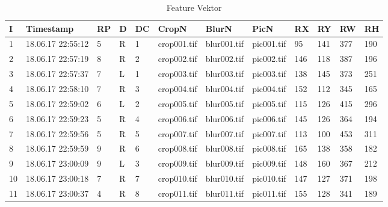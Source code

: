 \begin{table}[H]
\centering
\begin{tabular}{|l|l|l|l|l|l|l|l|l|l|l|l|}
\hline
\textbf{I} & \textbf{Timestamp}  & \textbf{RP} & \textbf{D} & \textbf{DC} & \textbf{CropN} & \textbf{BlurN} & \textbf{PicN} & \textbf{RX} & \textbf{RY} & \textbf{RW} & \textbf{RH} \\ \hline
1            & 18.06.17 22:55:12 & 5           & R            & 1           & crop001.tif       & blur001.tif       & pic001.tif       & 95          & 141         & 377         & 190         \\ \hline
2            & 18.06.17 22:57:19 & 8           & R            & 2           & crop002.tif       & blur002.tif       & pic002.tif       & 146         & 118         & 387         & 196         \\ \hline
3            & 18.06.17 22:57:37 & 7          & L            & 1           & crop003.tif       & blur003.tif       & pic003.tif       & 138         & 145         & 373         & 251         \\ \hline
4            & 18.06.17 22:58:10 & 7           & R            & 3           & crop004.tif       & blur004.tif       & pic004.tif       & 152         & 112         & 345         & 165         \\ \hline
5            & 18.06.17 22:59:02 & 6           & L            & 2           & crop005.tif       & blur005.tif       & pic005.tif       & 115         & 126         & 415         & 296         \\ \hline
6            & 18.06.17 22:59:23 & 5           & R            & 4           & crop006.tif       & blur006.tif       & pic006.tif       & 145         & 126         & 364         & 194         \\ \hline
7            & 18.06.17 22:59:56 & 5          & R            & 5           & crop007.tif       & blur007.tif       & pic007.tif       & 113         & 100         & 453         & 311         \\ \hline
8            & 18.06.17 22:59:59 & 9           & R            & 6           & crop008.tif       & blur008.tif       & pic008.tif       & 165         & 138         & 358         & 182         \\ \hline
9            & 18.06.17 23:00:09 & 9           & L            & 3           & crop009.tif       & blur009.tif       & pic009.tif       & 148         & 160         & 367         & 212         \\ \hline
10           & 18.06.17 23:00:18 & 7           & R            & 7           & crop010.tif       & blur010.tif       & pic010.tif       & 147         & 127         & 371         & 198         \\ \hline
11           & 18.06.17 23:00:37 & 4           & R            & 8           & crop011.tif       & blur011.tif       & pic011.tif       & 155         & 128         & 341         & 189         \\ \hline
\end{tabular}
\caption{Feature Vektor}
\label{tFeatureVektor}
\end{table}

